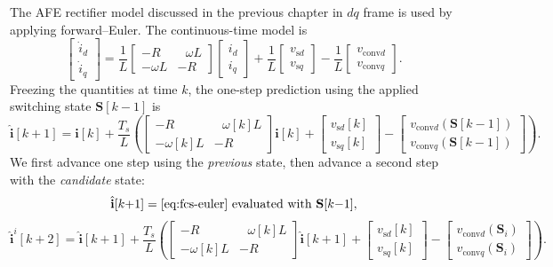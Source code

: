 The AFE rectifier model discussed in the previous chapter in $dq$ frame is used by applying forward–Euler. The continuous-time model is
\begin{equation}
\label{eq:fcs-ct}
\begin{bmatrix}\dot i_d\\[2pt]\dot i_q\end{bmatrix}
=
\frac{1}{L}
\begin{bmatrix}
- R & \ \ \ \omega L\\[2pt]
- \omega L & - R
\end{bmatrix}
\begin{bmatrix} i_d\\[2pt] i_q\end{bmatrix}
+
\frac{1}{L}\begin{bmatrix} v_{\mathrm{s}d}\\[2pt] v_{\mathrm{s}q}\end{bmatrix}
-
\frac{1}{L}\begin{bmatrix} v_{\mathrm{conv}d}\\[2pt] v_{\mathrm{conv}q}\end{bmatrix}.
\end{equation}
Freezing the quantities at time $k$, the one-step prediction using the applied switching state $\mathbf S[k{-}1]$ is
\begin{equation}
\label{eq:fcs-euler}
\hat{\mathbf i}[k{+}1]
= \mathbf i[k]
+\frac{T_s}{L}\!\left(
\begin{bmatrix}
- R & \ \ \ \omega[k] L\\[2pt]
- \omega[k] L & - R
\end{bmatrix}\!\mathbf i[k]
+\begin{bmatrix} v_{\mathrm{s}d}[k]\\[2pt] v_{\mathrm{s}q}[k]\end{bmatrix}
-\begin{bmatrix} v_{\mathrm{conv}d}(\mathbf S[k{-}1])\\[2pt] v_{\mathrm{conv}q}(\mathbf S[k{-}1])\end{bmatrix}
\right)\!.
\end{equation}
We first advance one step using the \emph{previous} state, then advance a second step with the \emph{candidate} state:
\begin{equation}
\label{eq:fcs-delay-1}
\hat{\mathbf i}[k{+}1]=\text{\eqref{eq:fcs-euler} evaluated with }\mathbf S[k{-}1],
\end{equation}
\begin{equation}
\label{eq:fcs-delay-2}
\hat{\mathbf i}^{i}[k{+}2]=\hat{\mathbf i}[k{+}1]
+\frac{T_s}{L}\!\left(
\begin{bmatrix}
- R & \ \ \ \omega[k] L\\[2pt]
- \omega[k] L & - R
\end{bmatrix}\!\hat{\mathbf i}[k{+}1]
+\begin{bmatrix} v_{\mathrm{s}d}[k]\\[2pt] v_{\mathrm{s}q}[k]\end{bmatrix}
-\begin{bmatrix} v_{\mathrm{conv}d}(\mathbf S_{i})\\[2pt] v_{\mathrm{conv}q}(\mathbf S_{i})\end{bmatrix}
\right)\!.
\end{equation}

